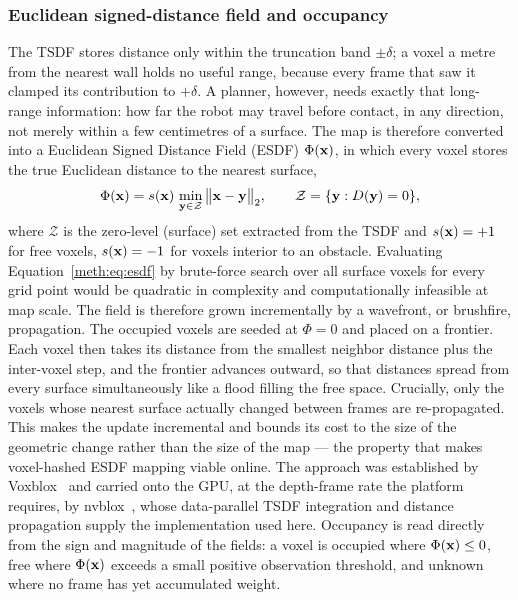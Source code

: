 \subsubsection{Euclidean signed-distance field and occupancy}

The TSDF stores distance only within the truncation band $\pm\delta$; a voxel a metre from the nearest wall holds no useful range, because every frame that saw it clamped its contribution to $+\delta$. A planner, however, needs exactly that long-range information: how far the robot may travel before contact, in any direction, not merely within a few centimetres of a surface. The map is therefore converted into a Euclidean Signed Distance Field (ESDF) $\Phi(\mathbf{x})$, in which every voxel stores the true Euclidean distance to the nearest surface,
\begin{equation}
  \Phi(\mathbf{x})=s(\mathbf{x})\,\min_{\mathbf{y}\in\mathcal{Z}}\big\lVert \mathbf{x}-\mathbf{y}\big\rVert_2,
  \qquad
  \mathcal{Z}=\{\mathbf{y}:D(\mathbf{y})=0\},
  \label{meth:eq:esdf}
\end{equation}
where $\mathcal{Z}$ is the zero-level (surface) set extracted from the TSDF and $s(\mathbf{x})=+1$ for free voxels, $s(\mathbf{x})=-1$ for voxels interior to an obstacle. Evaluating Equation~\eqref{meth:eq:esdf} by brute-force search over all surface voxels for every grid point would be quadratic in complexity and computationally infeasible at map scale. The field is therefore grown incrementally by a wavefront, or brushfire, propagation. The occupied voxels are seeded at $\Phi=0$ and placed on a frontier. Each voxel then takes its distance from the smallest neighbor distance plus the inter-voxel step, and the frontier advances outward, so that distances spread from every surface simultaneously like a flood filling the free space. Crucially, only the voxels whose nearest surface actually changed between frames are re-propagated. This makes the update incremental and bounds its cost to the size of the geometric change rather than the size of the map --- the property that makes voxel-hashed ESDF mapping viable online. The approach was established by Voxblox~\cite{oleynikova2017voxblox} and carried onto the GPU, at the depth-frame rate the platform requires, by nvblox~\cite{millane2024nvblox}, whose data-parallel TSDF integration and distance propagation supply the implementation used here. Occupancy is read directly from the sign and magnitude of the fields: a voxel is occupied where $\Phi(\mathbf{x})\le 0$, free where $\Phi(\mathbf{x})$ exceeds a small positive observation threshold, and unknown where no frame has yet accumulated weight.

